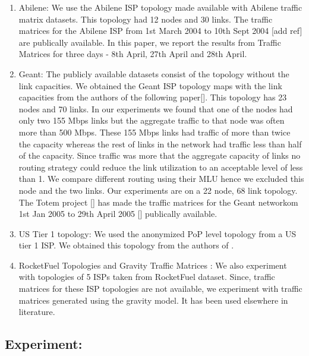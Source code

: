 \documentclass[a4paper,10pt]{article}
\begin{document}
\begin{enumerate}
\item 
Abilene: We use the Abilene ISP topology made available with Abilene traffic matrix datasets. This topology had 12 nodes and 30 links. The traffic matrices for the Abilene ISP from 1st March 2004 to 10th Sept 2004 [add ref] are publically available. In this paper, we report the results from Traffic Matrices for three days - 8th April, 27th April and 28th April.

\item 
Geant: The publicly available datasets consist of the topology without the link capacities. We obtained the Geant ISP topology maps with the link capacities from the authors of the following paper[]. This topology has 23 nodes and 70 links. In our experiments we found that one of the nodes had only two 155 Mbps links but the aggregate traffic to that node was often more than 500 Mbps. These 155 Mbps links had traffic of more than twice the capacity whereas the rest of links in the network had traffic less than half of the capacity. Since traffic was more that the aggregate capacity of links no routing strategy could reduce the link utilization to an acceptable level of less than 1. We compare different routing using their MLU hence we excluded this node and the two links. Our experiments are on a 22 node, 68 link topology. The Totem project [] has made the traffic matrices for the Geant networkom 1st Jan 2005 to 29th April 2005 []  publically available.
\item 
US Tier 1 topology: We used the anonymized PoP level topology from a US tier 1 ISP. We obtained this topology from the authors of \cite{MultiTM}. 
\item 
RocketFuel Topologies and Gravity Traffic Matrices : We also experiment with topologies of 5 ISPs taken from RocketFuel dataset. Since, traffic matrices for these ISP topologies are not available, we experiment with traffic matrices generated using the gravity model.  It has been used elsewhere in literature.

\end{enumerate}

\subsection{Experiment:} 
\end{document}
